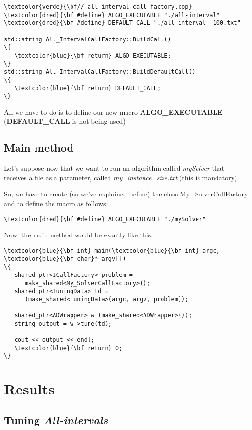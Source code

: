 \begin{Verbatim}[fontsize=\normalsize]
\textcolor{verde}{\bf// all_interval_call_factory.cpp}
\textcolor{dred}{\bf #define} ALGO_EXECUTABLE "./all-interval"
\textcolor{dred}{\bf #define} DEFAULT_CALL "./all-interval _100.txt"

std::string All_IntervalCallFactory::BuildCall()
\{
   \textcolor{blue}{\bf return} ALGO_EXECUTABLE;
\}
std::string All_IntervalCallFactory::BuildDefaultCall()
\{
   \textcolor{blue}{\bf return} DEFAULT_CALL;
\}
\end{Verbatim}

All we have to do is to define our new macro {\bf ALGO\_EXECUTABLE} ({\bf DEFAULT\_CALL} is not being used)

\subsection{Main method}

Let's suppose now that we want to run an algorithm called {\it mySolver} that receives a file as a parameter, called {\it my\_instance\_size.txt} (this is mandatory).

So, we have to create (as we've explained before) the class {\sc My\_SolverCallFactory} and to define the macro as follows:

\begin{Verbatim}[fontsize=\normalsize]
\textcolor{dred}{\bf #define} ALGO_EXECUTABLE "./mySolver"
\end{Verbatim}

Now, the main method would be exactly like this:

\begin{Verbatim}[fontsize=\normalsize]
\textcolor{blue}{\bf int} main(\textcolor{blue}{\bf int} argc, \textcolor{blue}{\bf char}* argv[])
\{
   shared_ptr<ICallFactory> problem = 
      make_shared<My_SolverCallFactory>();
   shared_ptr<TuningData> td = 
      (make_shared<TuningData>(argc, argv, problem));

   shared_ptr<ADWrapper> w (make_shared<ADWrapper>());
   string output = w->tune(td);

   cout << output << endl;
   \textcolor{blue}{\bf return} 0;
\}
\end{Verbatim}

\section{Results}

\subsection{ Tuning {\it All-intervals}}

